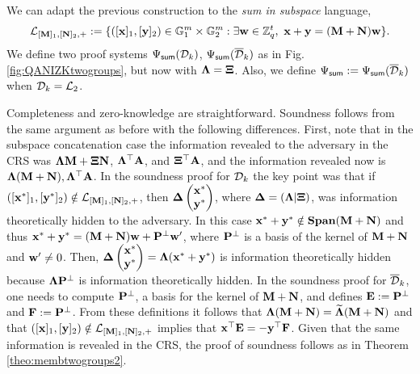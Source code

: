 We can adapt the previous construction to the \textit{sum in subspace} language, 
 $$\mathcal{L}_{[\mathbf{{M}}]_1,[\mathbf{{N}}]_2,+}:=\{ ([\mathbf{x}]_1,[\mathbf{y}]_2) \in \mathbb{G}_1^{m} \times \mathbb{G}_2^{m} :  \exists \mathbf{w} \in \mathbb{Z}_q^{t}, \  \mathbf{x}+\mathbf{y}=(\mathbf{{M}}+\mathbf{{N}}) \mathbf{w}\}.$$
 We define two proof systems $\Psi_{\mathsf{sum}}(\mathcal{D}_k)$, $\Psi_{\mathsf{sum}}(\overline{\mathcal{D}}_k)$ as in Fig. \ref{fig:QANIZKtwogroups}, but now 
with $\mathbf{{\Lambda}}=\mathbf{{\Xi}}$. Also, we define $\Psi_{\mathsf{sum}}:=\Psi_{\mathsf{sum}}(\overline{\mathcal{D}}_k)$ when $\mathcal{D}_k=\mathcal{L}_2$.

Completeness and zero-knowledge are straightforward. Soundness follows from the same argument as before with the following differences. First, note that in the subspace concatenation case the information revealed to the adversary in the CRS was $\mathbf{{\Lambda}}\mathbf{{M}}+\mathbf{{\Xi}}\mathbf{{N}}$, $\mathbf{{\Lambda}}^\top\mathbf{{A}}$, and $\mathbf{{\Xi}}^\top\mathbf{{A}}$, and the information revealed now is $\mathbf{{\Lambda}}(\mathbf{{M}}+\mathbf{{N}}),\mathbf{{\Lambda}}^{\top}\mathbf{{A}}$. In the soundness proof for $\mathcal{D}_k$ the key point was that if $([\mathbf{x}^*]_1,[\mathbf{y}^*]_2)\notin\mathcal{L}_{[\mathbf{{M}}]_1,[\mathbf{{N}}]_2,+}$, then $\mathbf{{\Delta}}\left(\begin{matrix}\mathbf{x}^*\\\mathbf{y}^*\end{matrix}\right)$, where $\mathbf{{\Delta}}=(\mathbf{{\Lambda}}|\mathbf{{\Xi}})$, was information theoretically hidden to the adversary. In this case $\mathbf{x}^*+\mathbf{y}^*\notin\mathbf{Span}(\mathbf{{M}}+\mathbf{{N}})$ and thus $\mathbf{x}^*+\mathbf{y}^*=(\mathbf{{M}}+\mathbf{{N}})\mathbf{w}+\mathbf{{P}}^\bot\mathbf{w}'$, where $\mathbf{{P}}^\bot$ is a basis of the kernel of $\mathbf{{M}}+\mathbf{{N}}$ and $\mathbf{w}'\neq 0$. Then, $\mathbf{{\Delta}}\left(\begin{matrix}\mathbf{x}^*\\\mathbf{y}^*\end{matrix}\right)=\mathbf{{\Lambda}}(\mathbf{x}^*+\mathbf{y}^*)$ is information theoretically hidden because $\mathbf{{\Lambda}}\mathbf{{P}}^\bot$ is information theoretically hidden. In the soundness proof for $\overline{\mathcal{D}}_k$, one needs to compute $\mathbf{{P}}^\bot$, a basis for the kernel of $\mathbf{{M}}+\mathbf{{N}}$, and defines $\mathbf{{E}}:=\mathbf{{P}}^\bot$ and $\mathbf{{F}}:=\mathbf{{P}}^\bot$. From these definitions it follows that $\mathbf{{\Lambda}}(\mathbf{{M}}+\mathbf{{N}})=\widetilde{\mathbf{{\Lambda}}}(\mathbf{{M}}+\mathbf{{N}})$ and that $([\mathbf{x}]_1,[\mathbf{y}]_2)\notin\mathcal{L}_{[\mathbf{{M}}]_1,[\mathbf{{N}}]_2,+}$ implies that $\mathbf{x}^\top\mathbf{{E}}=-\mathbf{y}^\top\mathbf{{F}}$. Given that the same information is revealed in the CRS, the proof of soundness follows as in Theorem \ref{theo:membtwogroups2}.
